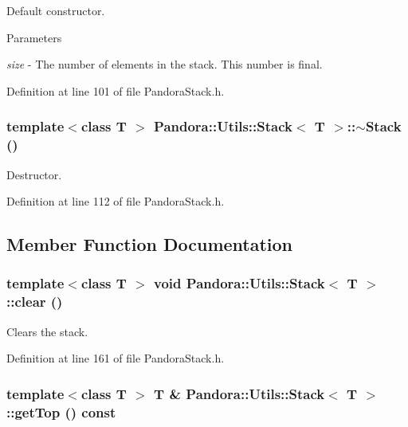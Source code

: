 Default constructor. 
\begin{DoxyParams}{Parameters}
\item[{\em size}]-\/ The number of elements in the stack. This number is final. \end{DoxyParams}


Definition at line 101 of file PandoraStack.h.\hypertarget{classPandora_1_1Utils_1_1Stack_a57c562706664edfabf43169405d5c247}{
\subsubsection[{$\sim$Stack}]{\setlength{\rightskip}{0pt plus 5cm}template$<$class T $>$ {\bf Pandora::Utils::Stack}$<$ T $>$::$\sim${\bf Stack} ()}}
\label{classPandora_1_1Utils_1_1Stack_a57c562706664edfabf43169405d5c247}


Destructor. 

Definition at line 112 of file PandoraStack.h.

\subsection{Member Function Documentation}
\hypertarget{classPandora_1_1Utils_1_1Stack_acbedc5107a2e03fe9a53d044efdcbabf}{
\subsubsection[{clear}]{\setlength{\rightskip}{0pt plus 5cm}template$<$class T $>$ void {\bf Pandora::Utils::Stack}$<$ T $>$::clear ()}}
\label{classPandora_1_1Utils_1_1Stack_acbedc5107a2e03fe9a53d044efdcbabf}


Clears the stack. 

Definition at line 161 of file PandoraStack.h.\hypertarget{classPandora_1_1Utils_1_1Stack_a9bdcdee9e004ce12b8dcfc36663d0eac}{
\subsubsection[{getTop}]{\setlength{\rightskip}{0pt plus 5cm}template$<$class T $>$ T \& {\bf Pandora::Utils::Stack}$<$ T $>$::getTop () const}}
\label{classPandora_1_1Utils_1_1Stack_a9bdcdee9e004ce12b8dcfc36663d0eac}


